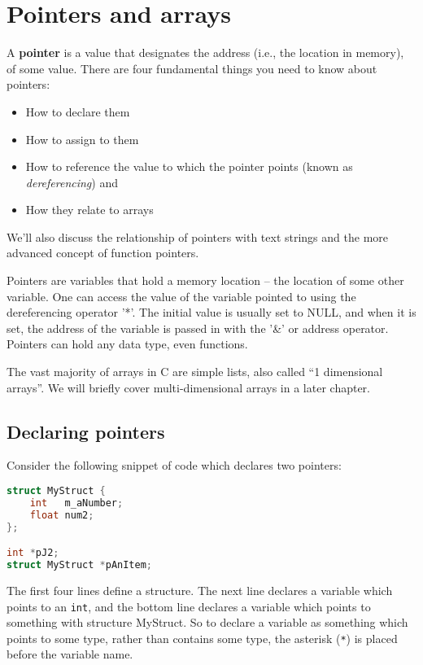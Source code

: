 \section{Pointers and arrays}
A \textbf{pointer} is a value that designates the address (i.e., the location
in memory), of some value. There are four fundamental things you need to know
about pointers:

\begin{itemize}
	\item How to declare them
	\item How to assign to them
	\item How to reference the value to which the pointer points (known as
\emph{dereferencing}) and
	\item How they relate to arrays
\end{itemize}

We'll also discuss the relationship of pointers with text strings and the more
advanced concept of function pointers.

Pointers are variables that hold a memory location -- the location of some
other variable.  One can access the value of the variable pointed to using the
dereferencing operator '*'. The initial value is usually set to NULL, and when
it is set, the address of the variable is passed in with the '\&' or address
operator.  Pointers can hold any data type, even functions.

The vast majority of arrays in C are simple lists, also called ``1 dimensional
arrays''. We will briefly cover multi-dimensional arrays in a later chapter.

\subsection{Declaring pointers}
Consider the following snippet of code which declares two pointers:
\lstset{basicstyle=\scriptsize, numbers=left, captionpos=b, tabsize=4}
\begin{lstlisting}[caption=Section \thesection listing \arabic{pntcnt},language={C},
breaklines=true,xleftmargin=15pt,label=lst:section\thesection listing\arabic{pntcnt}]
struct MyStruct {
	int   m_aNumber;
	float num2;
};

int *pJ2;
struct MyStruct *pAnItem;
\end{lstlisting}

The first four lines define a structure.  The next line declares a variable
which points to an \texttt{int}, and the bottom line declares a variable which
points to something with structure MyStruct. So to declare a variable as
something which points to some type, rather than contains some type, the
asterisk (\texttt{*}) is placed before the variable name. 

